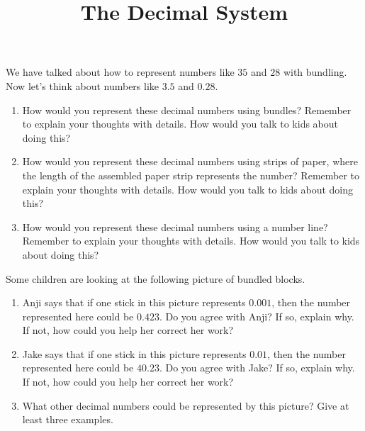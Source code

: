 \documentclass[nooutcomes,noauthor,handout]{ximera}
\title{The Decimal System}
\begin{document}
\begin{abstract}\end{abstract}
\maketitle


\begin{problem}
We have talked about how to represent numbers like $35$ and $28$ with bundling. Now let's think about numbers like $3.5$ and $0.28$.

\begin{enumerate}
	\item How would you represent these decimal numbers using bundles? Remember to explain your thoughts with details. How would you talk to kids about doing this?
	\item How would you represent these decimal numbers using strips of paper, where the length of the assembled paper strip represents the number? Remember to explain your thoughts with details. How would you talk to kids about doing this?
	\item How would you represent these decimal numbers using a number line? Remember to explain your thoughts with details. How would you talk to kids about doing this?
\end{enumerate}
\end{problem}


\begin{problem}
 Some children are looking at the following picture of bundled blocks.
\begin{image}
\end{image}
\begin{enumerate}
\item Anji says that if one stick in this picture represents $0.001$, then the number represented here could be $0.423$. Do you agree with Anji? If so, explain why. If not, how could you help her correct her work?
\item Jake says that if one stick in this picture represents $0.01$, then the number represented here could be $40.23$. Do you agree with Jake? If so, explain why. If not, how could you help her correct her work?
\item What other decimal numbers could be represented by this picture? Give at least three examples.
\end{enumerate}
\end{problem}
\end{document}
